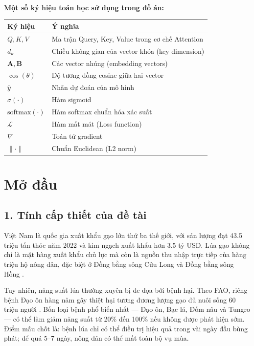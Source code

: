 \documentclass[13pt,a4paper]{extreport}
\begin{document}
\vspace{0.8cm}
\noindent \textbf{Một số ký hiệu toán học sử dụng trong đồ án:}

\begin{longtable}{>{\bfseries}p{3.5cm} p{10cm}}
\toprule
\textbf{Ký hiệu} & \textbf{Ý nghĩa} \\
\midrule
\endhead
$Q, K, V$       & Ma trận Query, Key, Value trong cơ chế Attention \\[3pt]
$d_k$           & Chiều không gian của vector khóa (key dimension) \\[3pt]
$\mathbf{A}, \mathbf{B}$ & Các vector nhúng (embedding vectors) \\[3pt]
$\cos(\theta)$  & Độ tương đồng cosine giữa hai vector \\[3pt]
$\hat{y}$       & Nhãn dự đoán của mô hình \\[3pt]
$\sigma(\cdot)$ & Hàm sigmoid \\[3pt]
$\text{softmax}(\cdot)$ & Hàm softmax chuẩn hóa xác suất \\[3pt]
$\mathcal{L}$   & Hàm mất mát (Loss function) \\[3pt]
$\nabla$        & Toán tử gradient \\[3pt]
$\|\cdot\|$     & Chuẩn Euclidean (L2 norm) \\[3pt]
\bottomrule
\end{longtable}
\clearpage

\setcounter{page}{1}

\chapter*{Mở đầu}

\section*{1. Tính cấp thiết của đề tài}
Việt Nam là quốc gia xuất khẩu gạo lớn thứ ba thế giới, với sản lượng đạt 43.5 triệu tấn thóc năm 2022 và kim ngạch xuất khẩu hơn 3.5 tỷ USD. Lúa gạo không chỉ là mặt hàng xuất khẩu chủ lực mà còn là nguồn thu nhập trực tiếp của hàng triệu hộ nông dân, đặc biệt ở Đồng bằng sông Cửu Long và Đồng bằng sông Hồng \cite{fao2023}.

Tuy nhiên, năng suất lúa thường xuyên bị đe dọa bởi bệnh hại. Theo FAO, riêng bệnh Đạo ôn hàng năm gây thiệt hại tương đương lượng gạo đủ nuôi sống 60 triệu người \cite{valent1991}. Bốn loại bệnh phổ biến nhất --- Đạo ôn, Bạc lá, Đốm nâu và Tungro --- có thể làm giảm năng suất từ 20\% đến 100\% nếu không được phát hiện sớm. Điểm mấu chốt là: bệnh lúa chỉ có thể điều trị hiệu quả trong vài ngày đầu bùng phát; để quá 5--7 ngày, nông dân có thể mất toàn bộ vụ mùa.
\end{document}

